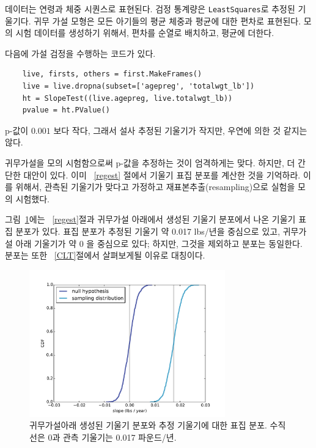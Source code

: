 데이터는 연령과 체중 시퀀스로 표현된다.
검정 통계량은 {\tt LeastSquares}로 추정된 기울기다.
귀무 가설 모형은 모든 아기들의 평균 체중과 평균에 대한 편차로 표현된다.
모의 시험 데이터를 생성하기 위해서, 편차를 순열로 배치하고, 평균에 더한다.


다음에 가설 검정을 수행하는 코드가 있다.

\begin{verbatim}
    live, firsts, others = first.MakeFrames()
    live = live.dropna(subset=['agepreg', 'totalwgt_lb'])
    ht = SlopeTest((live.agepreg, live.totalwgt_lb))
    pvalue = ht.PValue()
\end{verbatim}

p-값이 $0.001$ 보다 작다, 그래서 설사 추정된 기울기가 작지만, 우연에 의한 것 같지는 않다.


귀무가설을 모의 시험함으로써 p-값을 추정하는 것이 엄격하게는 맞다. 하지만, 더 간단한 대안이 있다. 이미 ~\ref{regest} 절에서 기울기 표집 분포를 계산한 것을 기억하라. 이를 위해서, 관측된 기울기가 맞다고 가정하고 재표본추출(resampling)으로 실험을 모의 시험했다.


그림~\ref{linear4}에는 ~\ref{regest}절과 귀무가설 아래에서 생성된 기울기 분포에서 나온 기울기 표집 분포가 있다.
표집 분포가 추정된 기울기 약 0.017 lbs/년을 중심으로 있고, 귀무가설 아래 기울기가 약 0 을 중심으로 있다; 하지만, 그것을 제외하고 분포는 동일한다. 분포는 또한 ~\ref{CLT}절에서 살펴보게될 이유로 대칭이다. 
 

\begin{figure}
\centerline{\includegraphics[height=2.5in]{figs/linear4.pdf}}
\caption{귀무가설아래 생성된 기울기 분포와 추정 기울기에 대한 표집 분포. 수직선은 0과 관측 기울기는 0.017 파운드/년.}
\label{linear4}
\end{figure}

